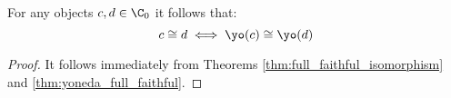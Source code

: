 \begin{theorem}
  For any objects $c, d\in\C_0$ it follows that:
  \[ c \cong d \iff \yo(c) \cong \yo(d) \]

  \begin{proof}
    It follows immediately from Theorems \ref{thm:full_faithful_isomorphism} and
    \ref{thm:yoneda_full_faithful}.
  \end{proof}
\end{theorem}